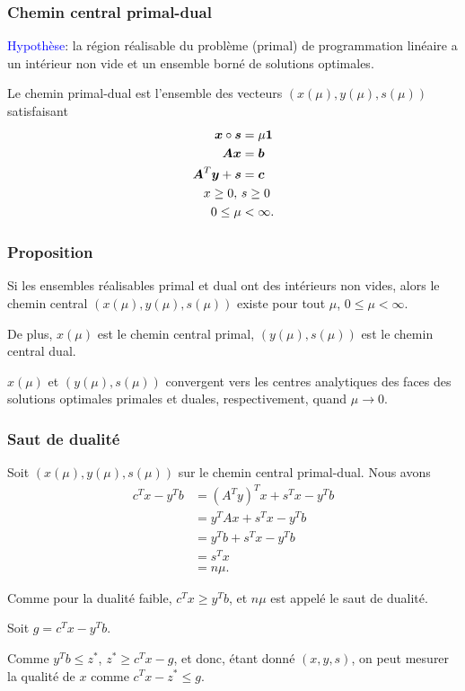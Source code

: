 \documentclass[usepdftitle=false, aspectratio=169]{beamer}
\begin{document}
\begin{frame}
\frametitle{Chemin central primal-dual}

\textcolor{blue}{Hypothèse}: la région réalisable du problème (primal) de programmation linéaire a un intérieur non vide et un ensemble borné de solutions optimales.


\mbox{}

Le chemin primal-dual est l'ensemble des vecteurs $(x(\mu), y(\mu), s(\mu))$ satisfaisant
\begin{align*}
{\boldsymbol{x}} \circ {\boldsymbol{s}} &= \mu {\boldsymbol{1}} \\
{\boldsymbol{A}}{\boldsymbol{x}} &= {\boldsymbol{b}} \\
{\boldsymbol{A}}^T{\boldsymbol{y}} + {\boldsymbol{s}} & = {\boldsymbol{c}} \\
x \geq 0,\ & s \geq 0 \\
0 \leq \mu & < \infty.
\end{align*}

\end{frame}

\begin{frame}
\frametitle{Proposition}

Si les ensembles réalisables primal et dual ont des intérieurs non vides, alors le chemin central $(x(\mu), y(\mu), s(\mu))$ existe pour tout $\mu$, $0 \leq \mu < \infty$.

\mbox{}

De plus, $x(\mu)$ est le chemin central primal, $(y(\mu), s(\mu))$ est le chemin central dual.

\mbox{}

$x(\mu)$ et $(y(\mu), s(\mu))$ convergent vers les centres analytiques des faces des solutions optimales primales et duales, respectivement, quand $\mu \rightarrow 0$.

\end{frame}

\begin{frame}
\frametitle{Saut de dualité}

Soit $(x(\mu), y(\mu), s(\mu))$ sur le chemin central primal-dual.
Nous avons
\begin{align*}
c^Tx - y^Tb &= (A^T y)^T x + s^Tx - y^T b \\
& = y^T Ax + s^Tx - y^T b \\
& = y^T b + s^Tx - y^T b \\
& = s^Tx \\
& = n\mu.
\end{align*}

\mbox{}

Comme pour la dualité faible, $c^T x \geq y^T b$, et $n\mu$ est appelé le saut de dualité.

\mbox{}

Soit $g = c^Tx - y^Tb$.

\mbox{}

Comme $y^T b \leq z^*$, $z^* \geq c^Tx - g$, et donc, étant donné $(x, y, s)$, on peut mesurer la qualité de $x$ comme $c^T x - z^* \leq g$.
\end{frame}
\end{document}
